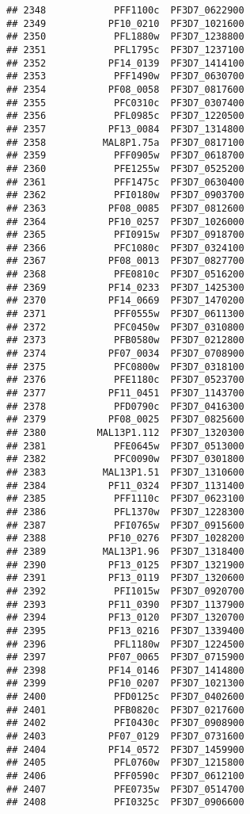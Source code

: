 \documentclass[12pt, a4paper]{article}\usepackage[]{graphicx}\usepackage[]{color}
\makeatletter
\newenvironment{kframe}{%
 \def\at@end@of@kframe{}%
 \ifinner\ifhmode%
  \def\at@end@of@kframe{\end{minipage}}%
  \begin{minipage}{\columnwidth}%
 \fi\fi%
 \def\FrameCommand##1{\hskip\@totalleftmargin \hskip-\fboxsep
 \colorbox{shadecolor}{##1}\hskip-\fboxsep
     \hskip-\linewidth \hskip-\@totalleftmargin \hskip\columnwidth}%
 \MakeFramed {\advance\hsize-\width
   \@totalleftmargin\z@ \linewidth\hsize
   \@setminipage}}%
 {\par\unskip\endMakeFramed%
 \at@end@of@kframe}
\newenvironment{knitrout}{}{} %
\makeatother
\begin{document}
\begin{knitrout}
\begin{kframe}
\begin{verbatim}
## 2348            PFF1100c  PF3D7_0622900
## 2349           PF10_0210  PF3D7_1021600
## 2350            PFL1880w  PF3D7_1238800
## 2351            PFL1795c  PF3D7_1237100
## 2352           PF14_0139  PF3D7_1414100
## 2353            PFF1490w  PF3D7_0630700
## 2354           PF08_0058  PF3D7_0817600
## 2355            PFC0310c  PF3D7_0307400
## 2356            PFL0985c  PF3D7_1220500
## 2357           PF13_0084  PF3D7_1314800
## 2358          MAL8P1.75a  PF3D7_0817100
## 2359            PFF0905w  PF3D7_0618700
## 2360            PFE1255w  PF3D7_0525200
## 2361            PFF1475c  PF3D7_0630400
## 2362            PFI0180w  PF3D7_0903700
## 2363           PF08_0085  PF3D7_0812600
## 2364           PF10_0257  PF3D7_1026000
## 2365            PFI0915w  PF3D7_0918700
## 2366            PFC1080c  PF3D7_0324100
## 2367           PF08_0013  PF3D7_0827700
## 2368            PFE0810c  PF3D7_0516200
## 2369           PF14_0233  PF3D7_1425300
## 2370           PF14_0669  PF3D7_1470200
## 2371            PFF0555w  PF3D7_0611300
## 2372            PFC0450w  PF3D7_0310800
## 2373            PFB0580w  PF3D7_0212800
## 2374           PF07_0034  PF3D7_0708900
## 2375            PFC0800w  PF3D7_0318100
## 2376            PFE1180c  PF3D7_0523700
## 2377           PF11_0451  PF3D7_1143700
## 2378            PFD0790c  PF3D7_0416300
## 2379           PF08_0025  PF3D7_0825600
## 2380         MAL13P1.112  PF3D7_1320300
## 2381            PFE0645w  PF3D7_0513000
## 2382            PFC0090w  PF3D7_0301800
## 2383          MAL13P1.51  PF3D7_1310600
## 2384           PF11_0324  PF3D7_1131400
## 2385            PFF1110c  PF3D7_0623100
## 2386            PFL1370w  PF3D7_1228300
## 2387            PFI0765w  PF3D7_0915600
## 2388           PF10_0276  PF3D7_1028200
## 2389          MAL13P1.96  PF3D7_1318400
## 2390           PF13_0125  PF3D7_1321900
## 2391           PF13_0119  PF3D7_1320600
## 2392            PFI1015w  PF3D7_0920700
## 2393           PF11_0390  PF3D7_1137900
## 2394           PF13_0120  PF3D7_1320700
## 2395           PF13_0216  PF3D7_1339400
## 2396            PFL1180w  PF3D7_1224500
## 2397           PF07_0065  PF3D7_0715900
## 2398           PF14_0146  PF3D7_1414800
## 2399           PF10_0207  PF3D7_1021300
## 2400            PFD0125c  PF3D7_0402600
## 2401            PFB0820c  PF3D7_0217600
## 2402            PFI0430c  PF3D7_0908900
## 2403           PF07_0129  PF3D7_0731600
## 2404           PF14_0572  PF3D7_1459900
## 2405            PFL0760w  PF3D7_1215800
## 2406            PFF0590c  PF3D7_0612100
## 2407            PFE0735w  PF3D7_0514700
## 2408            PFI0325c  PF3D7_0906600

\end{verbatim}
\end{kframe}
\end{knitrout}
\end{document}
